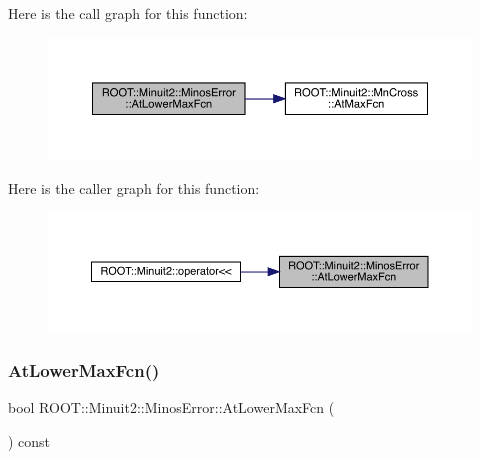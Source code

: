 Here is the call graph for this function\+:
\nopagebreak
\begin{figure}[H]
\begin{center}
\leavevmode
\includegraphics[width=350pt]{d2/dd1/classROOT_1_1Minuit2_1_1MinosError_a6ec22eac3b7dd1a281f1df710ed1dc74_cgraph}
\end{center}
\end{figure}
Here is the caller graph for this function\+:
\nopagebreak
\begin{figure}[H]
\begin{center}
\leavevmode
\includegraphics[width=350pt]{d2/dd1/classROOT_1_1Minuit2_1_1MinosError_a6ec22eac3b7dd1a281f1df710ed1dc74_icgraph}
\end{center}
\end{figure}
\mbox{\label{classROOT_1_1Minuit2_1_1MinosError_a6ec22eac3b7dd1a281f1df710ed1dc74}} 
\subsubsection{\texorpdfstring{AtLowerMaxFcn()}{AtLowerMaxFcn()}\hspace{0.1cm}{\footnotesize\ttfamily [3/3]}}
{\footnotesize\ttfamily bool R\+O\+O\+T\+::\+Minuit2\+::\+Minos\+Error\+::\+At\+Lower\+Max\+Fcn (\begin{DoxyParamCaption}{ }\end{DoxyParamCaption}) const\hspace{0.3cm}{\ttfamily [inline]}}

